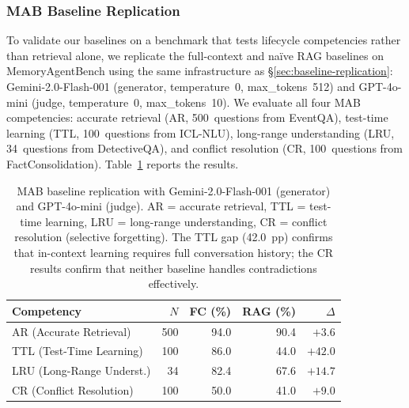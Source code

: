 \subsubsection{MAB Baseline Replication}
\label{sec:mab-replication}

To validate our baselines on a benchmark that tests lifecycle competencies
rather than retrieval alone, we replicate the full-context and na\"ive RAG
baselines on MemoryAgentBench using the same infrastructure as
\S\ref{sec:baseline-replication}: Gemini-2.0-Flash-001 (generator,
temperature~0, max\_tokens~512) and GPT-4o-mini (judge, temperature~0,
max\_tokens~10).  We evaluate all four MAB competencies: accurate retrieval
(AR, 500~questions from EventQA), test-time learning (TTL, 100~questions
from ICL-NLU), long-range understanding (LRU, 34~questions from
DetectiveQA), and conflict resolution (CR, 100~questions from
FactConsolidation).  Table~\ref{tab:mab-baselines} reports the results.

\begin{table}[!t]
\centering
\caption{MAB baseline replication with Gemini-2.0-Flash-001 (generator)
and GPT-4o-mini (judge).  AR = accurate retrieval, TTL = test-time
learning, LRU = long-range understanding, CR = conflict resolution
(selective forgetting).  The TTL gap (42.0~pp) confirms that in-context
learning requires full conversation history; the CR results confirm that
neither baseline handles contradictions effectively.}
\label{tab:mab-baselines}
\small
\begin{tabular}{@{}lrrrr@{}}
\toprule
\textbf{Competency} & \textbf{$N$} & \textbf{FC (\%)} & \textbf{RAG (\%)} & \textbf{$\Delta$} \\
\midrule
AR (Accurate Retrieval)     & 500 & 94.0 & 90.4 & $+3.6$ \\
TTL (Test-Time Learning)    & 100 & 86.0 & 44.0 & $+42.0$ \\
LRU (Long-Range Underst.)   &  34 & 82.4 & 67.6 & $+14.7$ \\
CR (Conflict Resolution)    & 100 & 50.0 & 41.0 & $+9.0$ \\
\bottomrule
\end{tabular}
\end{table}

